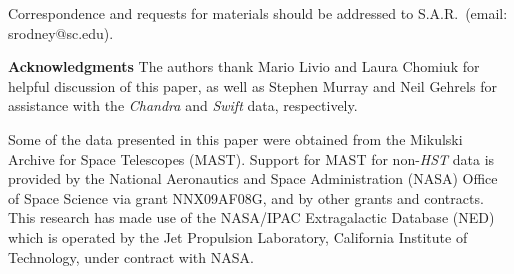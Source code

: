 \documentclass{article}
\def\Chandra{{\it Chandra}\xspace}
\def\Swift{{\it Swift}\xspace}
\begin{document}
% 
% 
% 
% 



\clearpage
\medskip
Correspondence and requests for materials
should be addressed to S.A.R.~(email: srodney@sc.edu).

\medskip
{\bf Acknowledgments}
The authors thank Mario Livio and Laura Chomiuk for helpful discussion
of this paper, as well as Stephen Murray and Neil Gehrels for
assistance with the \Chandra and \Swift data, respectively.

Some of the data presented in this paper were obtained from the
Mikulski Archive for Space Telescopes (MAST). Support for MAST 
for non-{\it HST} data is provided by the
National Aeronautics and Space Administration (NASA)
Office of Space Science via grant NNX09AF08G, and
by other grants and contracts.
This research has made use of the NASA/IPAC Extragalactic Database
(NED) which is operated by the Jet Propulsion Laboratory, California
Institute of Technology, under contract with NASA.
\end{document}
